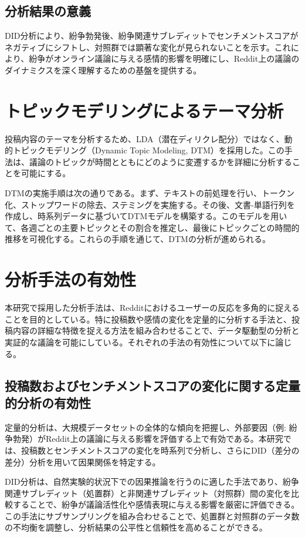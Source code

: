 \documentclass[11pt, a4j]{jreport}
\begin{document}
    \subsection{分析結果の意義}
    DID分析により、紛争勃発後、紛争関連サブレディットでセンチメントスコアがネガティブにシフトし、対照群では顕著な変化が見られないことを示す。これにより、紛争がオンライン議論に与える感情的影響を明確にし、Reddit上の議論のダイナミクスを深く理解するための基盤を提供する。

    \section{トピックモデリングによるテーマ分析}
    投稿内容のテーマを分析するため、LDA（潜在ディリクレ配分）ではなく、動的トピックモデリング（Dynamic Topic Modeling, DTM）を採用した。この手法は、議論のトピックが時間とともにどのように変遷するかを詳細に分析することを可能にする。

    DTMの実施手順は次の通りである。まず、テキストの前処理を行い、トークン化、ストップワードの除去、ステミングを実施する。その後、文書-単語行列を作成し、時系列データに基づいてDTMモデルを構築する。このモデルを用いて、各週ごとの主要トピックとその割合を推定し、最後にトピックごとの時間的推移を可視化する。これらの手順を通じて、DTMの分析が進められる。

    \section{分析手法の有効性}
    本研究で採用した分析手法は、Redditにおけるユーザーの反応を多角的に捉えることを目的としている。特に投稿数や感情の変化を定量的に分析する手法と、投稿内容の詳細な特徴を捉える方法を組み合わせることで、データ駆動型の分析と実証的な議論を可能にしている。それぞれの手法の有効性について以下に論じる。

    \subsection{投稿数およびセンチメントスコアの変化に関する定量的分析の有効性}
    定量的分析は、大規模データセットの全体的な傾向を把握し、外部要因（例: 紛争勃発）がReddit上の議論に与える影響を評価する上で有効である。本研究では、投稿数とセンチメントスコアの変化を時系列で分析し、さらにDID（差分の差分）分析を用いて因果関係を特定する。

    DID分析は、自然実験的状況下での因果推論を行うのに適した手法であり、紛争関連サブレディット（処置群）と非関連サブレディット（対照群）間の変化を比較することで、紛争が議論活性化や感情表現に与える影響を厳密に評価できる。この手法にサブサンプリングを組み合わせることで、処置群と対照群のデータ数の不均衡を調整し、分析結果の公平性と信頼性を高めることができる。
\end{document}

